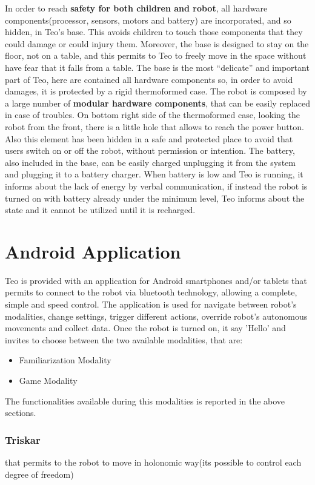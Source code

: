 In order to reach \textbf{safety for both children and robot}, all hardware components(processor, sensors, motors and battery) are incorporated, and so hidden, in Teo's base. This avoids children to touch those components that they could damage or could injury them. Moreover, the base is designed to stay on the floor, not on a table, and this permits to Teo to freely move in the space without have fear that it falls from a table.
The base is the most “delicate” and important part of Teo, here are contained all hardware components so, in order to avoid damages, it is protected by a rigid thermoformed case. The robot is composed by a large number of \textbf{modular hardware components}, that can be easily replaced in case of troubles. On bottom right side of the thermoformed case, looking the robot from the front, there is a little hole that allows to reach the power button. Also this element has been hidden in a safe and protected place to avoid that users switch on or off the robot, without permission or intention. The battery, also included in the base, can be easily charged unplugging it from the system and plugging it to a battery charger. When battery is low and Teo is running, it informs about the lack of energy by verbal communication, if instead the robot is turned on with battery already under the minimum level, Teo informs about the state and it cannot be utilized until it is recharged.\\ 


\section{Android Application}
Teo is provided with an application for Android smartphones and/or tablets that permits to connect to the robot via bluetooth technology, allowing a complete, simple and speed control. The application is used for navigate between robot's modalities, change settings, trigger different actions, override robot's autonomous movements and collect data. 
Once the robot is turned on, it say 'Hello' and invites to choose between the two available modalities, that are:
\begin{itemize}
	\item Familiarization Modality
	\item Game Modality	
\end{itemize}
The functionalities available during this modalities is reported in the above sections.
	 

\iffalse
\subsubsection{Triskar}
that permits to the robot to move in holonomic way(its possible to control each degree of freedom) 

